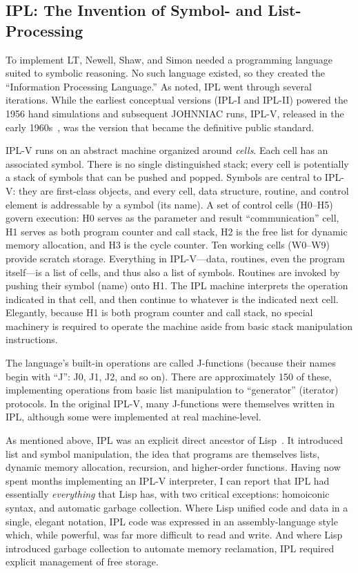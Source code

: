 \documentclass[journal]{IEEEtran}
\begin{document}
\subsection{IPL: The Invention of Symbol- and List-Processing}

To implement LT, Newell, Shaw, and Simon needed a programming language
suited to symbolic reasoning.  No such language existed, so they
created the ``Information Processing Language.''  As noted, IPL went
through several iterations.  While the earliest conceptual versions
(IPL-I and IPL-II) powered the 1956 hand simulations and subsequent
JOHNNIAC runs, IPL-V, released in the early 1960s~\cite{newell1964ipl}, was the version
that became the definitive public standard.

IPL-V runs on an abstract machine organized around \textit{cells}.
Each cell has an associated symbol. There is no single distinguished
stack; every cell is potentially a stack of symbols that can be pushed
and popped. Symbols are central to IPL-V: they are first-class
objects, and every cell, data structure, routine, and control element
is addressable by a symbol (its name). A set of control cells
(H0--H5) govern execution: H0 serves as the parameter and result
``communication'' cell, H1 serves as both program counter and call
stack, H2 is the free list for dynamic memory allocation, and H3 is
the cycle counter. Ten working cells (W0--W9) provide scratch
storage. Everything in IPL-V---data, routines, even the program
itself---is a list of cells, and thus also a list of symbols. Routines
are invoked by pushing their symbol (name) onto H1. The IPL machine
interprets the operation indicated in that cell, and then continue to
whatever is the indicated next cell. Elegantly, because H1 is both
program counter and call stack, no special machinery is required to
operate the machine aside from basic stack manipulation
instructions.

The language's built-in operations are called J-functions (because
their names begin with ``J'': J0, J1, J2, and so on). There are
approximately 150 of these, implementing operations from basic list
manipulation to ``generator'' (iterator) protocols. In the original
IPL-V, many J-functions were themselves written in IPL, although some
were implemented at real machine-level.

As mentioned above, IPL was an explicit direct ancestor of
Lisp~\cite{mccarthy1960lisp}. It introduced list and symbol
manipulation, the idea that programs are themselves lists, dynamic
memory allocation, recursion, and higher-order functions. Having now
spent months implementing an IPL-V interpreter, I can report that IPL
had essentially \textit{everything} that Lisp has, with two critical
exceptions: homoiconic syntax, and automatic garbage collection. Where
Lisp unified code and data in a single, elegant notation, IPL code was
expressed in an assembly-language style which, while powerful, was far
more difficult to read and write. And where Lisp introduced garbage
collection to automate memory reclamation, IPL required explicit
management of free storage.
\end{document}
